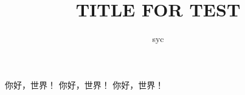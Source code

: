 \documentclass[a4paper, 12pt, fontset=windows, draft]{ctexbook}
\title{TITLE FOR TEST}
\author{syc}
\begin{document}

你好，世界！
你好，世界！
\clearpage
你好，世界！
\end{document}

